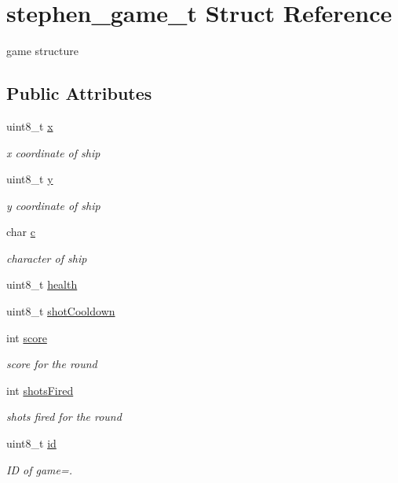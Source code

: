 \hypertarget{structstephen__game__t}{}\section{stephen\+\_\+game\+\_\+t Struct Reference}
\label{structstephen__game__t}


game structure  


\subsection*{Public Attributes}
\begin{DoxyCompactItemize}
\item 
uint8\+\_\+t \mbox{\hyperlink{structstephen__game__t_ae0dcb3293dee995b121c954c1f6a6687}{x}}
\begin{DoxyCompactList}\small\item\em x coordinate of ship \end{DoxyCompactList}\item 
uint8\+\_\+t \mbox{\hyperlink{structstephen__game__t_a59eebb9e6d67a454f592830896596b2b}{y}}
\begin{DoxyCompactList}\small\item\em y coordinate of ship \end{DoxyCompactList}\item 
char \mbox{\hyperlink{structstephen__game__t_a0a1090bb518acd0e060a3824fd855548}{c}}
\begin{DoxyCompactList}\small\item\em character of ship \end{DoxyCompactList}\item 
uint8\+\_\+t \mbox{\hyperlink{structstephen__game__t_aaca290ce9f7cecd8f62d6f653e5b5ac3}{health}}
\item 
uint8\+\_\+t \mbox{\hyperlink{structstephen__game__t_a9f603d972a88a53507662b789b369caf}{shot\+Cooldown}}
\item 
int \mbox{\hyperlink{structstephen__game__t_ae7004833cd3781e62d81db75b36f13dc}{score}}
\begin{DoxyCompactList}\small\item\em score for the round \end{DoxyCompactList}\item 
int \mbox{\hyperlink{structstephen__game__t_a65ff538b6969568e226978a2cb9f6996}{shots\+Fired}}
\begin{DoxyCompactList}\small\item\em shots fired for the round \end{DoxyCompactList}\item 
uint8\+\_\+t \mbox{\hyperlink{structstephen__game__t_ab55bf04b1c1d7f8efe5c006b20be3b89}{id}}
\begin{DoxyCompactList}\small\item\em ID of game=. \end{DoxyCompactList}\end{DoxyCompactItemize}


